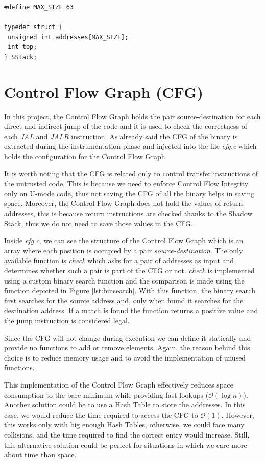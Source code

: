 \begin{lstlisting}[style=CStyle, caption = Shadow Stack definition, label={lst:ss}]
#define MAX_SIZE 63

typedef struct {
 unsigned int addresses[MAX_SIZE];
 int top;
} SStack;
\end{lstlisting}

\section{Control Flow Graph (CFG)}
\label{sec:project_cfg}

In this project, the Control Flow Graph holds the pair source-destination for each
direct and indirect jump of the code and it is used to check the correctness of each
\textit{JAL} and \textit{JALR} instruction. As already said the CFG of the
binary is extracted during the instrumentation phase and injected into the file
\textit{cfg.c} which holds the configuration for the Control Flow Graph.

It is worth noting that the CFG is related only to control transfer instructions
of the untrusted code. This is because we need to enforce Control Flow Integrity
only on U-mode code, thus not saving the CFG of all the binary helps in saving space.
Moreover, the Control Flow Graph does not hold the values of return addresses,
this is because return instructions are checked thanks to the Shadow Stack, thus
we do not need to save those values in the CFG.

Inside \textit{cfg.c}, we can see the structure of the Control Flow Graph which is
an array where each position is occupied by a pair \textit{source-destination}. The
only available function is \textit{check} which asks for a pair of addresses as
input and determines whether such a pair is part of the CFG or not. \textit{check}
is implemented using a custom binary search function and the comparison is made
using the function depicted in Figure \ref{lst:binsearch}. With this function,
the binary search first searches for the source address and, only when found it searches
for the destination address. If a match is found the function returns a positive
value and the jump instruction is considered legal.

Since the CFG will not change during execution we can define it statically and
provide no functions to add or remove elements. Again, the reason behind this
choice is to reduce memory usage and to avoid the implementation of unused
functions.

This implementation of the Control Flow Graph effectively reduces space
consumption to the bare minimum while providing fast lookups ($\mathcal{O}(\log{n}
)$). Another solution could be to use a Hash Table to store the addresses. In
this case, we would reduce the time required to access the CFG to $\mathcal{O}(1)$.
However, this works only with big enough Hash Tables, otherwise, we could face many
collisions, and the time required to find the correct entry would increase. Still,
this alternative solution could be perfect for situations in which we care more
about time than space.

